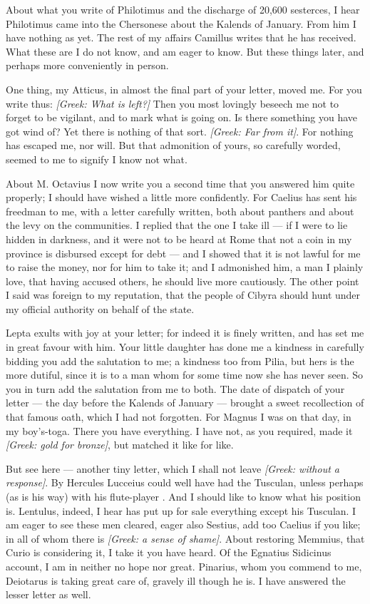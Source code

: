  About what you write of Philotimus and the discharge of 20,600 sesterces, I hear Philotimus came into the Chersonese about the Kalends of January. From him I have nothing as yet. The rest of my affairs Camillus writes that he has received. What these are I do not know, and am eager to know. But these things later, and perhaps more conveniently in person.

 One thing, my Atticus, in almost the final part of your letter, moved me. For you write thus: \textit{[Greek: What is left?]} Then you most lovingly beseech me not to forget to be vigilant, and to mark what is going on. Is there something you have got wind of? Yet there is nothing of that sort. \textit{[Greek: Far from it]}. For nothing has escaped me, nor will. But that admonition of yours, so carefully worded, seemed to me to signify I know not what.

 About M. Octavius I now write you a second time that you answered him quite properly; I should have wished a little more confidently. For Caelius has sent his freedman to me, with a letter carefully written, both about panthers and about the levy on the communities. I replied that the one I take ill --- if I were to lie hidden in darkness, and it were not to be heard at Rome that not a coin in my province is disbursed except for debt --- and I showed that it is not lawful for me to raise the money, nor for him to take it; and I admonished him, a man I plainly love, that having accused others, he should live more cautiously. The other point I said was foreign to my reputation, that the people of Cibyra should hunt under my official authority on behalf of the state.

 Lepta exults with joy at your letter; for indeed it is finely written, and has set me in great favour with him. Your little daughter has done me a kindness in carefully bidding you add the salutation to me; a kindness too from Pilia, but hers is the more dutiful, since it is to a man whom for some time now she has never seen. So you in turn add the salutation from me to both. The date of dispatch of your letter --- the day before the Kalends of January --- brought a sweet recollection of that famous oath, which I had not forgotten. For Magnus I was on that day, in my boy's-toga. There you have everything. I have not, as you required, made it \textit{[Greek: gold for bronze]}, but matched it like for like.

 But see here --- another tiny letter, which I shall not leave \textit{[Greek: without a response]}. By Hercules \dag Lucceius could well have had the Tusculan, unless perhaps (as is his way) with his flute-player \dag. And I should like to know what his position is. Lentulus, indeed, I hear has put up for sale everything except his Tusculan. I am eager to see these men cleared, eager also Sestius, add too Caelius if you like; in all of whom there is \textit{[Greek: a sense of shame]}. About restoring Memmius, that Curio is considering it, I take it you have heard. Of the Egnatius Sidicinus account, I am in neither no hope nor great. Pinarius, whom you commend to me, Deiotarus is taking great care of, gravely ill though he is. I have answered the lesser letter as well.

